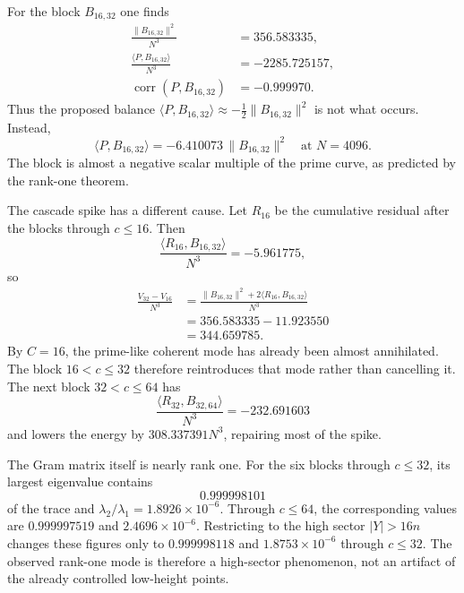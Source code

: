 \documentclass[11pt]{article}
\theoremstyle{definition}
\theoremstyle{remark}
\newcommand{\1}{\mathbf{1}}
\begin{document}
For the block $B_{16,32}$ one finds
\begin{align}
 \frac{\|B_{16,32}\|^2}{N^3}&=356.583335,\\
 \frac{\langle P,B_{16,32}\rangle}{N^3}&=-2285.725157,\\
 \operatorname{corr}(P,B_{16,32})&=-0.999970.
 \label{eq:block-16-32-prime}
\end{align}
Thus the proposed balance
$\langle P,B_{16,32}\rangle\approx-\frac12\|B_{16,32}\|^2$
is not what occurs.  Instead,
\begin{equation}
 \boxed{
 \langle P,B_{16,32}\rangle
 =-6.410073\,\|B_{16,32}\|^2
 \quad\text{at }N=4096.
 }
 \label{eq:block-16-32-ratio}
\end{equation}
The block is almost a negative scalar multiple of the prime curve, as
predicted by the rank-one theorem.

The cascade spike has a different cause.  Let $R_{16}$ be the cumulative
residual after the blocks through $c\le16$.  Then
\begin{equation}
 \frac{\langle R_{16},B_{16,32}\rangle}{N^3}
 =-5.961775,
 \label{eq:R16-block-inner}
\end{equation}
so
\begin{align}
 \frac{V_{32}-V_{16}}{N^3}
 &=\frac{\|B_{16,32}\|^2
 +2\langle R_{16},B_{16,32}\rangle}{N^3}\\
 &=356.583335-11.923550\\
 &=344.659785.
 \label{eq:block-spike-identity}
\end{align}
By $C=16$, the prime-like coherent mode has already been almost
annihilated.  The block $16<c\le32$ therefore reintroduces that mode
rather than cancelling it.  The next block $32<c\le64$ has
\[
 \frac{\langle R_{32},B_{32,64}\rangle}{N^3}=-232.691603
\]
and lowers the energy by $308.337391N^3$, repairing most of the spike.

The Gram matrix itself is nearly rank one.  For the six blocks through
$c\le32$, its largest eigenvalue contains
\begin{equation}
 0.999998101
 \label{eq:Gram-top-share-32}
\end{equation}
of the trace and
$\lambda_2/\lambda_1=1.8926\times10^{-6}$.  Through $c\le64$, the
corresponding values are $0.999997519$ and
$2.4696\times10^{-6}$.  Restricting to the high sector
$|Y|>16n$ changes these figures only to $0.999998118$ and
$1.8753\times10^{-6}$ through $c\le32$.  The observed rank-one mode is
therefore a high-sector phenomenon, not an artifact of the already
controlled low-height points.
\end{document}

